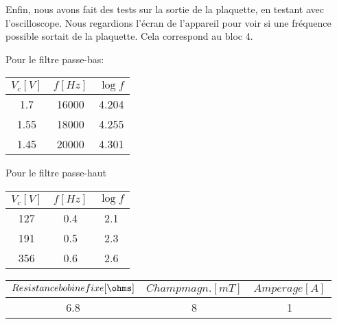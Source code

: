 Enfin, nous avons fait des tests sur la sortie de la plaquette, en testant avec l'oscilloscope.  Nous regardions l'écran de
l'appareil pour voir si une fréquence possible sortait de la plaquette.  Cela correspond au bloc 4.



Pour le filtre passe-bas:
\begin{center}
\begin{tabular}{|c|c|c|}
\hline
$V_c[V]$ & $f[Hz]$ & $\log{f}$ \\
\hline
1.7 & 16000 & 4.204 \\
\hline
1.55 & 18000 & 4.255 \\
\hline
1.45 & 20000 & 4.301 \\
\hline
\end{tabular}
\end{center}

Pour le filtre passe-haut

\begin{center}
	\begin{tabular}{|c|c|c|}
		\hline
		$V_c[V]$ & $f[Hz]$ & $\log{f}$ \\
		\hline
		127 & 0.4 & 2.1\\
		\hline
		191 & 0.5 & 2.3\\
		\hline
		356 & 0.6 & 2.6 \\
		\hline
	\end{tabular}
\end{center}

\begin{center}
	\begin{tabular}{|c|c|c|}
		\hline
		$Resistance bobine fixe[\ohms]$ & $Champ magn.[mT]$ & $Amperage[A]$ \\
		\hline
		6.8 & 8 & 1\\
		\hline
	\end{tabular}
\end{center}




